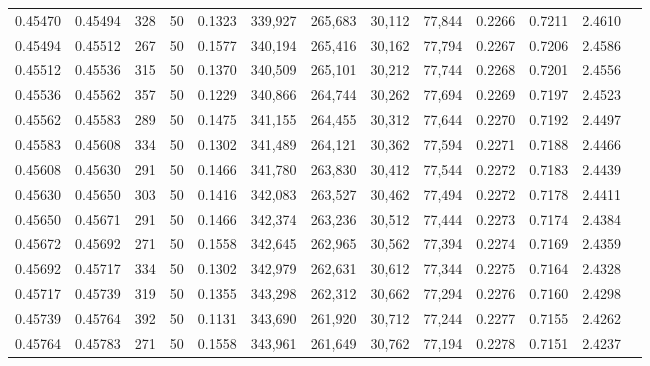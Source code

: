 \begin{tabular}{rrrrrrrrrrrrr}
0.45470 & 0.45494 &   328 &  50 &                                     0.1323 & 339,927 & 265,683 &  30,112 &  77,844 & 0.2266 & 0.7211 & 2.4610 \\
0.45494 & 0.45512 &   267 &  50 &                                     0.1577 & 340,194 & 265,416 &  30,162 &  77,794 & 0.2267 & 0.7206 & 2.4586 \\
0.45512 & 0.45536 &   315 &  50 &                                     0.1370 & 340,509 & 265,101 &  30,212 &  77,744 & 0.2268 & 0.7201 & 2.4556 \\
0.45536 & 0.45562 &   357 &  50 &                                     0.1229 & 340,866 & 264,744 &  30,262 &  77,694 & 0.2269 & 0.7197 & 2.4523 \\
0.45562 & 0.45583 &   289 &  50 &                                     0.1475 & 341,155 & 264,455 &  30,312 &  77,644 & 0.2270 & 0.7192 & 2.4497 \\
0.45583 & 0.45608 &   334 &  50 &                                     0.1302 & 341,489 & 264,121 &  30,362 &  77,594 & 0.2271 & 0.7188 & 2.4466 \\
0.45608 & 0.45630 &   291 &  50 &                                     0.1466 & 341,780 & 263,830 &  30,412 &  77,544 & 0.2272 & 0.7183 & 2.4439 \\
0.45630 & 0.45650 &   303 &  50 &                                     0.1416 & 342,083 & 263,527 &  30,462 &  77,494 & 0.2272 & 0.7178 & 2.4411 \\
0.45650 & 0.45671 &   291 &  50 &                                     0.1466 & 342,374 & 263,236 &  30,512 &  77,444 & 0.2273 & 0.7174 & 2.4384 \\
0.45672 & 0.45692 &   271 &  50 &                                     0.1558 & 342,645 & 262,965 &  30,562 &  77,394 & 0.2274 & 0.7169 & 2.4359 \\
0.45692 & 0.45717 &   334 &  50 &                                     0.1302 & 342,979 & 262,631 &  30,612 &  77,344 & 0.2275 & 0.7164 & 2.4328 \\
0.45717 & 0.45739 &   319 &  50 &                                     0.1355 & 343,298 & 262,312 &  30,662 &  77,294 & 0.2276 & 0.7160 & 2.4298 \\
0.45739 & 0.45764 &   392 &  50 &                                     0.1131 & 343,690 & 261,920 &  30,712 &  77,244 & 0.2277 & 0.7155 & 2.4262 \\
0.45764 & 0.45783 &   271 &  50 &                                     0.1558 & 343,961 & 261,649 &  30,762 &  77,194 & 0.2278 & 0.7151 & 2.4237 \\

\end{tabular}

